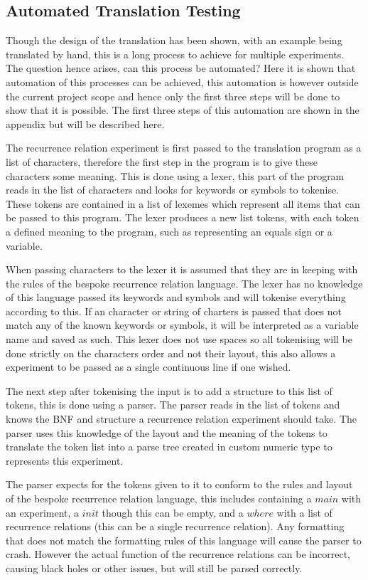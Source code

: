 \documentclass{article}
\begin{document}
\subsection{Automated Translation Testing}
Though the design of the translation has been shown, with an example being translated by hand, this is a long process to achieve for multiple experiments. The question hence arises, can this process be automated? Here it is shown that automation of this processes can be achieved, this automation is however outside the current project scope and hence only the first three steps will be done to show that it is possible. The first three steps of this automation are shown in the appendix but will be described here. 

The recurrence relation experiment is first passed to the translation program as a list of characters, therefore the first step in the program is to give these characters some meaning. This is done using a lexer, this part of the program reads in the list of characters and looks for keywords or symbols to tokenise. These tokens are contained in a list of lexemes which represent all items that can be passed to this program. The lexer produces a new list tokens, with each token a defined meaning to the program, such as representing an equals sign or a variable.     

When passing characters to the lexer it is assumed that they are in keeping with the rules of the bespoke recurrence relation language. The lexer has no knowledge of this language passed its keywords and symbols and will tokenise everything according to this. If an character or string of charters is passed that does not match any of the known keywords  or symbols, it will be interpreted as a variable name and saved as such. This lexer does not use spaces so all tokenising will be done strictly on the characters order and not their layout, this also allows a experiment to be passed as a single continuous line if one wished. 

The next step after tokenising the input is to add a structure to this list of tokens, this is done using a parser. The parser reads in the list of tokens and knows the BNF and structure a recurrence relation experiment should take. The parser uses this knowledge of the layout and the meaning of the tokens to translate the token list into a parse tree created in custom numeric type to represents this experiment.  

The parser expects for the tokens given to it to conform to the rules and layout of the bespoke recurrence relation language, this includes containing a $main$ with an experiment, a $init$ though this can be empty, and a $where$ with a list of recurrence relations (this can be a single recurrence relation). Any formatting that does not match the formatting rules of this language will cause the parser to crash. However the actual function of the recurrence relations can be incorrect, causing black holes or other issues, but will still be parsed correctly.
\end{document}
